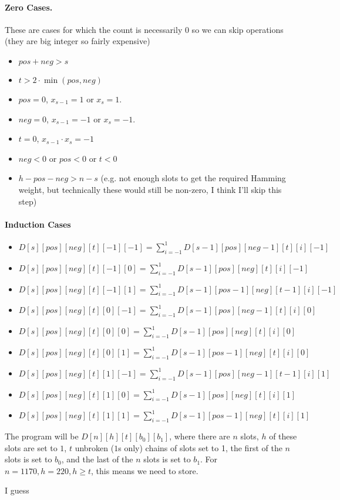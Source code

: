 \paragraph{Zero Cases.}
These are cases for which the count is necessarily 0 so we can skip
operations (they are big integer so fairly expensive)
\begin{itemize}
\item $pos+neg>s$
\item $t>2\cdot \min(pos,neg)$
\item $pos=0$, $x_{s-1}=1$ or $x_{s}=1$.
\item $neg=0$, $x_{s-1}=-1$ or $x_{s}=-1$. 
\item $t=0$, $x_{s-1}\cdot x_{s}=-1$
\item $neg<0$ or $pos<0$ or $t<0$
\item $h-pos-neg>n-s$ (e.g. not enough slots to get the required
  Hamming weight, but technically these would still be non-zero, I
  think I'll skip this step)
\end{itemize}

\paragraph{Induction Cases}
\begin{itemize}
\item $D[s][pos][neg][t][-1][-1]=\sum_{i=-1}^{1}D[s-1][pos][neg-1][t][i][-1]$
\item $D[s][pos][neg][t][-1][0]=\sum_{i=-1}^{1}D[s-1][pos][neg][t][i][-1]$
\item $D[s][pos][neg][t][-1][1]=\sum_{i=-1}^{1}D[s-1][pos-1][neg][t-1][i][-1]$
\item $D[s][pos][neg][t][0][-1]=\sum_{i=-1}^{1}D[s-1][pos][neg-1][t][i][0]$
\item $D[s][pos][neg][t][0][0]=\sum_{i=-1}^{1}D[s-1][pos][neg][t][i][0]$
\item
  $D[s][pos][neg][t][0][1]=\sum_{i=-1}^{1}D[s-1][pos-1][neg][t][i][0]$
\item $D[s][pos][neg][t][1][-1]=\sum_{i=-1}^{1}D[s-1][pos][neg-1][t-1][i][1]$
\item $D[s][pos][neg][t][1][0]=\sum_{i=-1}^{1}D[s-1][pos][neg][t][i][1]$
\item
  $D[s][pos][neg][t][1][1]=\sum_{i=-1}^{1}D[s-1][pos-1][neg][t][i][1]$
\end{itemize}


The program will be $D[n][h][t][b_0][b_1]$, where there are $n$
slots, $h$ of these slots are set to $1$, $t$ unbroken ($1$s only)
chains of slots set to 1, the first of the $n$ slots is set to $b_0$, and
the last of the $n$ slots is set to $b_1$. For $n=1170, h=220, h\geq
t$, this means we need to store. 

I guess

